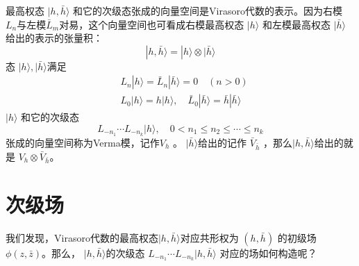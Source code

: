 最高权态 $|h,\bar{h}\rangle$ 和它的次级态张成的向量空间是Virasoro代数的表示。因为右模$ L_n 与左模 \bar{L}_m$对易，这个向量空间也可看成右模最高权态 $|h\rangle$ 和左模最高权态 $|\bar{h}\rangle $给出的表示的张量积：
\begin{equation}
	|h, \bar{h}\rangle=|h\rangle \otimes|\bar{h}\rangle
\end{equation}
态 $|h\rangle,|\bar{h}\rangle $满足
\begin{equation}
	\begin{aligned} &L_{n}|h\rangle=\bar{L}_{n}|\bar{h}\rangle=0 \quad(n>0) \\& L_{0}|h\rangle=h|h\rangle, \quad \bar{L}_{0}|\bar{h}\rangle=\bar{h}|\bar{h}\rangle \end{aligned}
\end{equation}
$|h\rangle$ 和它的次级态
\begin{equation}
	L_{-n_{1}} \cdots L_{-n_{k}}|h\rangle, \quad 0<n_{1} \leq n_{2} \leq \cdots \leq n_{k}
\end{equation}
张成的向量空间称为Verma模，记作$ V_h$ 。 $|\bar{h}\rangle $给出的记作 $\bar{V}_{\bar{h}}$ ，那么$ |h,\bar{h}\rangle $给出的就是 $V_{h} \otimes \bar{V}_{\bar{h}} $。

\section{次级场}

我们发现，Virasoro代数的最高权态$ |h,\bar{h}\rangle $对应共形权为 $(h,\bar{h})$ 的初级场 $\phi(z,\bar{z}) $。那么， $|h,\bar{h}\rangle $的次级态 $L_{-n_{1}} \cdots L_{-n_{k}}|h, \bar{h}\rangle$ 对应的场如何构造呢？

